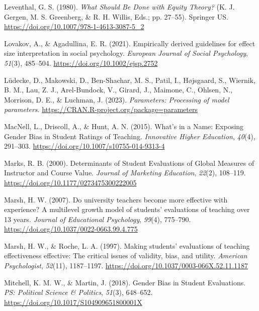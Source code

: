 \documentclass[
  man]{apa7}
\newlength{\cslhangindent}
\newlength{\cslentryspacingunit} %
\newenvironment{CSLReferences}[2] %
 {%
  \setlength{\parindent}{0pt}
  \ifodd #1
  \let\oldpar\par
  \def\par{\hangindent=\cslhangindent\oldpar}
  \fi
  \setlength{\parskip}{#2\cslentryspacingunit}
 }%
 {}
\begin{document}
\begin{CSLReferences}{1}{0}
\leavevmode{}%
Leventhal, G. S. (1980). \emph{What Should Be Done with Equity Theory?} (K. J. Gergen, M. S. Greenberg, \& R. H. Willis, Eds.; pp. 27--55). Springer US. \url{https://doi.org/10.1007/978-1-4613-3087-5_2}

\leavevmode{}%
Lovakov, A., \& Agadullina, E. R. (2021). Empirically derived guidelines for effect size interpretation in social psychology. \emph{European Journal of Social Psychology}, \emph{51}(3), 485--504. \url{https://doi.org/10.1002/ejsp.2752}

\leavevmode{}%
Lüdecke, D., Makowski, D., Ben-Shachar, M. S., Patil, I., Højsgaard, S., Wiernik, B. M., Lau, Z. J., Arel-Bundock, V., Girard, J., Maimone, C., Ohlsen, N., Morrison, D. E., \& Luchman, J. (2023). \emph{Parameters: Processing of model parameters}. \url{https://CRAN.R-project.org/package=parameters}

\leavevmode{}%
MacNell, L., Driscoll, A., \& Hunt, A. N. (2015). What{'}s in a Name: Exposing Gender Bias in Student Ratings of Teaching. \emph{Innovative Higher Education}, \emph{40}(4), 291--303. \url{https://doi.org/10.1007/s10755-014-9313-4}

\leavevmode{}%
Marks, R. B. (2000). Determinants of Student Evaluations of Global Measures of Instructor and Course Value. \emph{Journal of Marketing Education}, \emph{22}(2), 108--119. \url{https://doi.org/10.1177/0273475300222005}

\leavevmode{}%
Marsh, H. W. (2007). Do university teachers become more effective with experience? A multilevel growth model of students' evaluations of teaching over 13 years. \emph{Journal of Educational Psychology}, \emph{99}(4), 775--790. \url{https://doi.org/10.1037/0022-0663.99.4.775}

\leavevmode{}%
Marsh, H. W., \& Roche, L. A. (1997). Making students' evaluations of teaching effectiveness effective: The critical issues of validity, bias, and utility. \emph{American Psychologist}, \emph{52}(11), 1187--1197. \url{https://doi.org/10.1037/0003-066X.52.11.1187}

\leavevmode{}%
Mitchell, K. M. W., \& Martin, J. (2018). Gender Bias in Student Evaluations. \emph{PS: Political Science \& Politics}, \emph{51}(3), 648--652. \url{https://doi.org/10.1017/S104909651800001X}


\end{CSLReferences}
\end{document}
